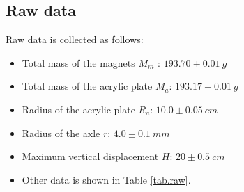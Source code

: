 \documentclass[a4paper]{article}
\begin{document}
\subsection{Raw data}

Raw data is collected as follows:

\begin{itemize}
    \item Total mass of the magnets $M_m$ : $193.70\pm0.01\SI{}{g}$
    \item Total mass of the acrylic plate $M_a$: $193.17\pm0.01\SI{}{g}$
    \item Radius of the acrylic plate $R_a$: $10.0\pm0.05\SI{}{cm}$
    \item Radius of the axle $r$: $4.0\pm0.1\SI{}{mm}$
    \item Maximum vertical displacement $H$: $20\pm0.5\SI{}{cm}$
    \item Other data is shown in Table \ref{tab.raw}.
\end{itemize}
\end{document}
